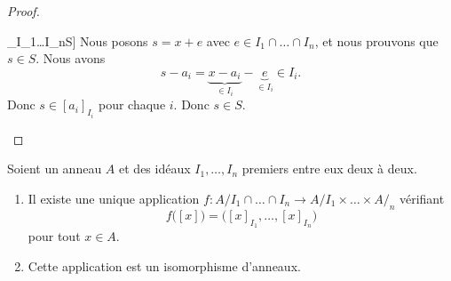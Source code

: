 \begin{proof}
\begin{subproof}
\begin{subproof}
			\spitem[\( [x]_{I_1\cap\ldots\cap I_n}\subset S\)]
			Nous posons \( s=x+e\) avec \( e\in I_1\cap\ldots \cap I_n\), et nous prouvons que \( s\in S\). Nous avons
			\begin{equation}
				s-a_i=\underbrace{x-a_i}_{\in I_i}-\underbrace{e}_{\in I_i}\in I_i.
			\end{equation}
			Donc \( s\in [a_i]_{I_i}\) pour chaque \( i\). Donc \( s\in S\).
		\end{subproof}
	\end{subproof}
\end{proof}


\begin{theorem}	\label{THOooCBWWooEGjeSV}
	Soient un anneau \( A\) et des idéaux \( I_1,\ldots,I_n\) premiers entre eux deux à deux.
	\begin{enumerate}
		\item		\label{ITEMooPNFZooInhOQo}
		      Il existe une unique application \(f \colon A/I_1\cap\ldots\cap I_n\to A/I_1\times\ldots\times A/_n  \) vérifiant
		      \begin{equation}
			      f\big( [x] \big)=\big( [x]_{I_1},\ldots,[x]_{I_n} \big)
		      \end{equation}
		      pour tout \( x\in A\).
		\item		\label{ITEMooYSDNooSpMVcB}
		      Cette application est un isomorphisme d'anneaux.
	\end{enumerate}
\end{theorem}

